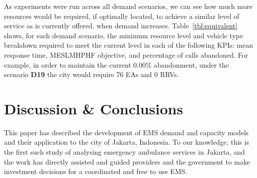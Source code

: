 \documentclass[preprint,12pt]{elsarticle}
\begin{document}
As experiments were run across all demand scenarios, we can see how much more
resources would be required, if optimally located, to achieve a similar level
of service as is currently offered, when demand increases.
Table~\ref{tbl:equivalent} shows, for each demand scenario, the minimum
resource level and vehicle type breakdown required to meet the current level
in each of the following KPIs: mean response time, MESLMHPHF objective, and
percentage of calls abandoned. For example, in order to maintain the current
0.00\% abandonment, under the scenario \textbf{D19} the city would require
76 EAs and 0 RRVs.

\begin{table}
\begin{center}
\caption{Resources required to maintain current KPI levels when optimising
         locations under the four demand scenarios.}
\label{tbl:equivalent}
\end{center}
\end{table}



\section{Discussion \& Conclusions}\label{sec:discussion}
This paper has described the development of EMS demand and capacity models and
their application to the city of Jakarta, Indonesia. To our knowledge, this is
the first such study of analysing emergency ambulance services in Jakarta, and
the work has directly assisted and guided providers and the government to make
investment decisions for a coordinated and free to use EMS.
\end{document}
